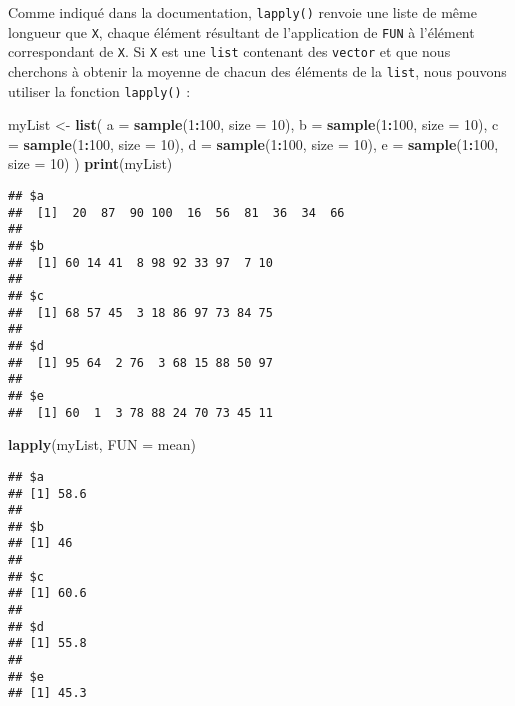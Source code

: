 \documentclass[]{book}
\newenvironment{Shaded}{\begin{snugshade}}{\end{snugshade}}
\newcommand{\KeywordTok}[1]{\textcolor[rgb]{0.13,0.29,0.53}{\textbf{#1}}}
\newcommand{\DataTypeTok}[1]{\textcolor[rgb]{0.13,0.29,0.53}{#1}}
\newcommand{\DecValTok}[1]{\textcolor[rgb]{0.00,0.00,0.81}{#1}}
\newcommand{\StringTok}[1]{\textcolor[rgb]{0.31,0.60,0.02}{#1}}
\newcommand{\OperatorTok}[1]{\textcolor[rgb]{0.81,0.36,0.00}{\textbf{#1}}}
\newcommand{\NormalTok}[1]{#1}
\theoremstyle{definition}
\theoremstyle{definition}
\theoremstyle{definition}
\theoremstyle{remark}
\begin{document}
Comme indiqué dans la documentation, \texttt{lapply()} renvoie une liste
de même longueur que \texttt{X}, chaque élément résultant de
l'application de \texttt{FUN} à l'élément correspondant de \texttt{X}.
Si \texttt{X} est une \texttt{list} contenant des \texttt{vector} et que
nous cherchons à obtenir la moyenne de chacun des éléments de la
\texttt{list}, nous pouvons utiliser la fonction \texttt{lapply()} :

\begin{Shaded}
\begin{Highlighting}[]
\NormalTok{myList <-}\StringTok{ }\KeywordTok{list}\NormalTok{(}
  \DataTypeTok{a =} \KeywordTok{sample}\NormalTok{(}\DecValTok{1}\OperatorTok{:}\DecValTok{100}\NormalTok{, }\DataTypeTok{size =} \DecValTok{10}\NormalTok{), }
  \DataTypeTok{b =} \KeywordTok{sample}\NormalTok{(}\DecValTok{1}\OperatorTok{:}\DecValTok{100}\NormalTok{, }\DataTypeTok{size =} \DecValTok{10}\NormalTok{), }
  \DataTypeTok{c =} \KeywordTok{sample}\NormalTok{(}\DecValTok{1}\OperatorTok{:}\DecValTok{100}\NormalTok{, }\DataTypeTok{size =} \DecValTok{10}\NormalTok{), }
  \DataTypeTok{d =} \KeywordTok{sample}\NormalTok{(}\DecValTok{1}\OperatorTok{:}\DecValTok{100}\NormalTok{, }\DataTypeTok{size =} \DecValTok{10}\NormalTok{), }
  \DataTypeTok{e =} \KeywordTok{sample}\NormalTok{(}\DecValTok{1}\OperatorTok{:}\DecValTok{100}\NormalTok{, }\DataTypeTok{size =} \DecValTok{10}\NormalTok{)}
\NormalTok{)}
\KeywordTok{print}\NormalTok{(myList)}
\end{Highlighting}
\end{Shaded}

\begin{verbatim}
## $a
##  [1]  20  87  90 100  16  56  81  36  34  66
## 
## $b
##  [1] 60 14 41  8 98 92 33 97  7 10
## 
## $c
##  [1] 68 57 45  3 18 86 97 73 84 75
## 
## $d
##  [1] 95 64  2 76  3 68 15 88 50 97
## 
## $e
##  [1] 60  1  3 78 88 24 70 73 45 11
\end{verbatim}

\begin{Shaded}
\begin{Highlighting}[]
\KeywordTok{lapply}\NormalTok{(myList, }\DataTypeTok{FUN =}\NormalTok{ mean)}
\end{Highlighting}
\end{Shaded}

\begin{verbatim}
## $a
## [1] 58.6
## 
## $b
## [1] 46
## 
## $c
## [1] 60.6
## 
## $d
## [1] 55.8
## 
## $e
## [1] 45.3
\end{verbatim}
\end{document}
